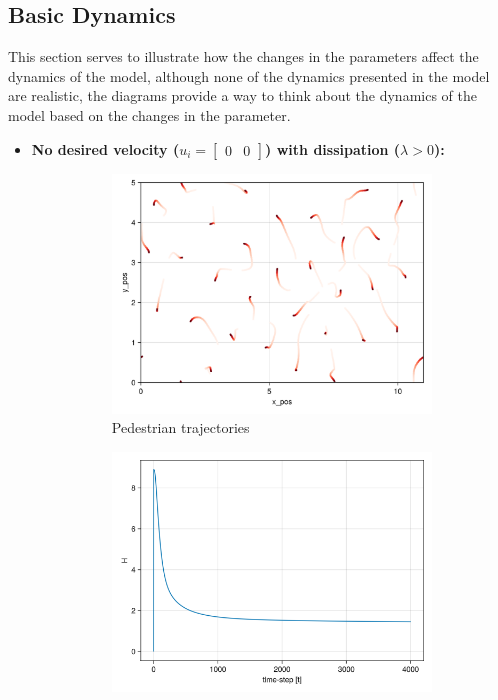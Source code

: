 \subsection{Basic Dynamics}
This section serves to illustrate how the changes in the parameters affect the dynamics of the model, although none of the dynamics presented in the model are realistic, the diagrams provide a way to think about the dynamics of the model based on the changes in the parameter.
\pagebreak
\begin{itemize}
    \item \textbf{No desired velocity ($u_i = \begin{bmatrix} 0 & 0 \end{bmatrix}$) with dissipation ($\lambda > 0$):}
\begin{figure}[H]
    \centering
    \begin{subfigure}{\textwidth}
        \centering
        \includegraphics[width=0.6\linewidth]{figures/crystallizationdflow_4001.png}
        \caption{Pedestrian trajectories}
        \label{plot:crys_traj}
    \end{subfigure}
    \begin{subfigure}{.40\textwidth}
        \centering
        \includegraphics[width=\linewidth]{figures/H_crystallization.png}

\end{subfigure}
\end{figure}
\end{itemize}
